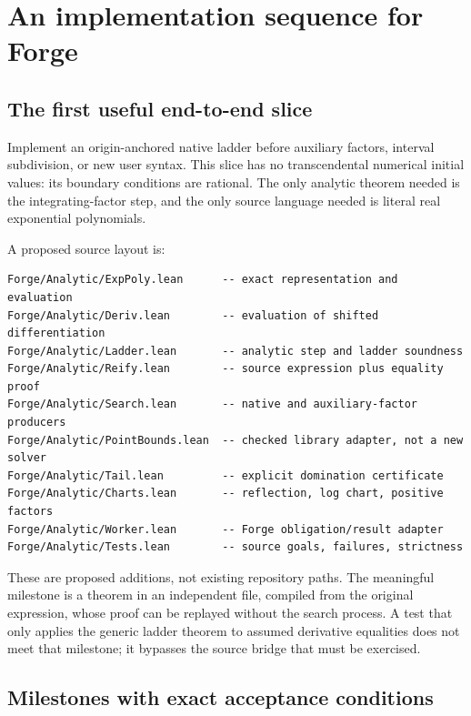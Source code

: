 \section{An implementation sequence for Forge}
\label{sec:implementation}

\subsection{The first useful end-to-end slice}

Implement an origin-anchored native ladder before auxiliary factors, interval
subdivision, or new user syntax. This slice has no transcendental numerical
initial values: its boundary conditions are rational. The only analytic theorem
needed is the integrating-factor step, and the only source language needed is
literal real exponential polynomials.

A proposed source layout is:
\par\noindent\begin{minipage}{\linewidth}
\begin{lstlisting}
Forge/Analytic/ExpPoly.lean      -- exact representation and evaluation
Forge/Analytic/Deriv.lean        -- evaluation of shifted differentiation
Forge/Analytic/Ladder.lean       -- analytic step and ladder soundness
Forge/Analytic/Reify.lean        -- source expression plus equality proof
Forge/Analytic/Search.lean       -- native and auxiliary-factor producers
Forge/Analytic/PointBounds.lean  -- checked library adapter, not a new solver
Forge/Analytic/Tail.lean         -- explicit domination certificate
Forge/Analytic/Charts.lean       -- reflection, log chart, positive factors
Forge/Analytic/Worker.lean       -- Forge obligation/result adapter
Forge/Analytic/Tests.lean        -- source goals, failures, strictness
\end{lstlisting}
\end{minipage}\par

These are proposed additions, not existing repository paths. The meaningful
milestone is a theorem in an independent file, compiled from the original
expression, whose proof can be replayed without the search process. A test that
only applies the generic ladder theorem to assumed derivative equalities does
not meet that milestone; it bypasses the source bridge that must be exercised.

\subsection{Milestones with exact acceptance conditions}

